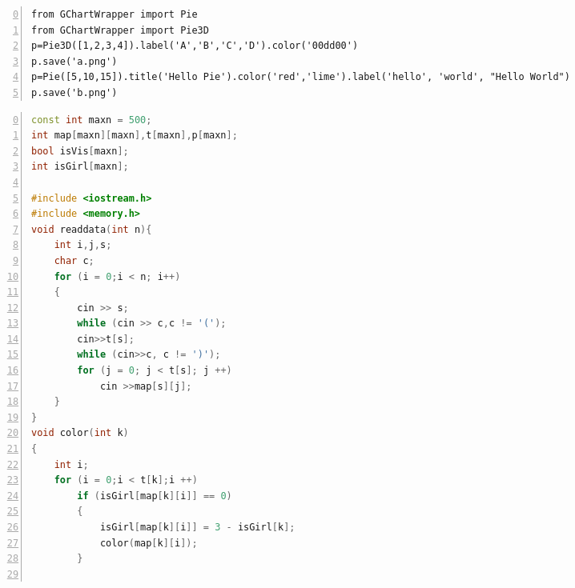 \documentclass{ctexart}
\begin{document}
\begin{CJK*}{GBK}{song}
\renewcommand{\ttdefault}{pcr}

\begin{lstlisting}[frame=single,
                    framerule=1pt,
                    numbers=left,
                    firstnumber=0,
                    caption={Sample python source code},]
from GChartWrapper import Pie
from GChartWrapper import Pie3D
p=Pie3D([1,2,3,4]).label('A','B','C','D').color('00dd00')
p.save('a.png')
p=Pie([5,10,15]).title('Hello Pie').color('red','lime').label('hello', 'world', "Hello World")
p.save('b.png')
\end{lstlisting}


\begin{lstlisting}[frame=single,
                    framerule=1pt,
                    numbers=left,
                    language={C++},
                    firstnumber=0,caption={Sample c++ source code}]
const int maxn = 500;
int map[maxn][maxn],t[maxn],p[maxn];
bool isVis[maxn];
int isGirl[maxn];

#include <iostream.h>
#include <memory.h>
void readdata(int n){
	int i,j,s;
	char c;
	for (i = 0;i < n; i++)
	{
		cin >> s;
		while (cin >> c,c != '(');
		cin>>t[s];
		while (cin>>c, c != ')');
		for (j = 0; j < t[s]; j ++)
			cin >>map[s][j];
	}
}
void color(int k)
{
	int i;
	for (i = 0;i < t[k];i ++)
		if (isGirl[map[k][i]] == 0)
		{
			isGirl[map[k][i]] = 3 - isGirl[k];
			color(map[k][i]);
		}


\end{lstlisting}
\end{CJK*}
\end{document}
